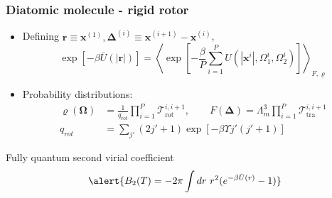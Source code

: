 \documentclass[xcolor=svgnames]{beamer}
\DeclareRobustCommand{\mc}[1]{\mathcal{#1}}
\DeclareRobustCommand{\mbf}[1]{{\boldsymbol {#1}}}
\begin{document}
        \begin{frame}
            \frametitle{Diatomic molecule - rigid rotor}
            \begin{itemize}
                \justifying
                \item Defining $\mbf{r} \equiv \mbf{x}^{(1)}, \mbf{\Delta}^{(i)} \equiv \mbf{x}^{(i+1)} - \mbf{x}^{(i)}$,
                \begin{equation*}
                    \exp [-\beta \bar{U} (|\mbf{r}|)] = \left< \exp \left[ -\frac{\beta}{P} \sum_{i=1}^P U (|\mbf{x}^i|,\Omega_1^i,\Omega_2^i) \right] \right>_{F,\varrho}
                \end{equation*}
                \item Probability distributions:
                \begin{align*}
                    \varrho(\mbf{\Omega}) &= \frac{1}{q_\text{rot}} \displaystyle\prod_{i=1}^P \mc{T}_\text{rot}^{i,i+1}, \qquad F(\mbf{\Delta}) = \Lambda_m^3 \displaystyle\prod_{i=1}^P \mc{T}_\text{tra}^{i,i+1}\\
                    q_{rot} &= \displaystyle\sum_{j'} (2j' + 1) \exp \left[-\beta \Upsilon j' (j'+1) \right]
                \end{align*}
            \end{itemize}
            \begin{block}{Fully quantum second virial coefficient}
                \begin{equation*}
                    \alert{B_2 (T) = -2 \pi \displaystyle\int dr~ r^2 (e^{-\beta \bar{U} (r)} - 1)}
                \end{equation*}
            \end{block}
        \end{frame}
\end{document}
